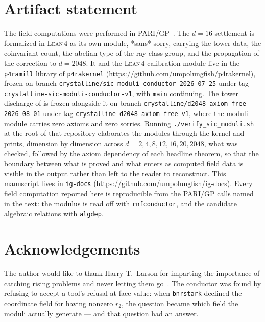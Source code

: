 \documentclass[12pt,a4paper]{article}
\newcommand{\Lean}{\textsc{Lean\,4}}
\begin{document}
\section*{Artifact statement}
The field computations were performed in PARI/GP~\cite{PARI}. The $d=16$ settlement is formalized in \Lean{} as its own module, *sans* sorry, carrying the tower data, the coinvariant count, the abelian type of the ray class group, and the propagation of the correction to $d=2048$. It and the \Lean{} calibration module live in the \texttt{p4ramill} library of \texttt{p4rakernel} (\url{https://github.com/umpolungfish/p4rakernel}), frozen on branch \texttt{crystalline/sic-moduli-conductor-2026-07-25} under tag \texttt{crystalline-sic-moduli-conductor-v1}, with \texttt{main} continuing. The tower discharge of  is frozen alongside it on branch \texttt{crystalline/d2048-axiom-free-2026-08-01} under tag \texttt{crystalline-d2048-axiom-free-v1}, where the moduli module carries zero axioms and zero sorries. Running \texttt{./verify\_sic\_moduli.sh} at the root of that repository elaborates the modules through the kernel and prints, dimension by dimension across $d = 2, 4, 8, 12, 16, 20, 2048$, what was checked, followed by the axiom dependency of each headline theorem, so that the boundary between what is proved and what enters as computed field data is visible in the output rather than left to the reader to reconstruct. This manuscript lives in \texttt{ig-docs} (\url{https://github.com/umpolungfish/ig-docs}). Every field computation reported here is reproducible from the PARI/GP calls named in the text: the modulus is read off with \texttt{rnfconductor}, and the candidate algebraic relations with \texttt{algdep}.

\section*{Acknowledgements}
The author would like to thank Harry T.\ Larson for imparting the importance of catching rising problems and never letting them go~\cite{Larson1961}. The conductor was found by refusing to accept a tool's refusal at face value: when \texttt{bnrstark} declined the coordinate field for having nonzero $r_2$, the question became which field the moduli actually generate — and that question had an answer.
\end{document}
